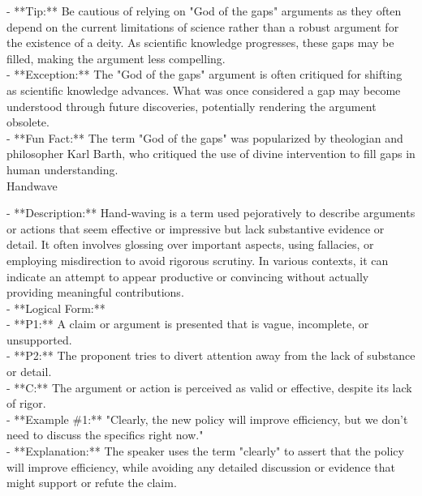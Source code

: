 \documentclass[a4paper,12pt,single,pdftex]{scrbook}
\begin{document}
    
      - **Tip:** Be cautious of relying on "God of the gaps" arguments as they often depend on the current limitations of science rather than a robust argument for the existence of a deity. As scientific knowledge progresses, these gaps may be filled, making the argument less compelling.
    \\

    
      - **Exception:** The "God of the gaps" argument is often critiqued for shifting as scientific knowledge advances. What was once considered a gap may become understood through future discoveries, potentially rendering the argument obsolete.
    \\

    
      - **Fun Fact:** The term "God of the gaps" was popularized by theologian and philosopher Karl Barth, who critiqued the use of divine intervention to fill gaps in human understanding.
    \\

  

Handwave
    
      - **Description:** Hand-waving is a term used pejoratively to describe arguments or actions that seem effective or impressive but lack substantive evidence or detail. It often involves glossing over important aspects, using fallacies, or employing misdirection to avoid rigorous scrutiny. In various contexts, it can indicate an attempt to appear productive or convincing without actually providing meaningful contributions.
    \\

    
      - **Logical Form:**
    \\

    
        - **P1:** A claim or argument is presented that is vague, incomplete, or unsupported.
    \\

    
        - **P2:** The proponent tries to divert attention away from the lack of substance or detail.
    \\

    
        - **C:** The argument or action is perceived as valid or effective, despite its lack of rigor.
    \\

    
      - **Example \#1:** "Clearly, the new policy will improve efficiency, but we don’t need to discuss the specifics right now."
    \\

    
      - **Explanation:** The speaker uses the term "clearly" to assert that the policy will improve efficiency, while avoiding any detailed discussion or evidence that might support or refute the claim.
    \\
\end{document}
